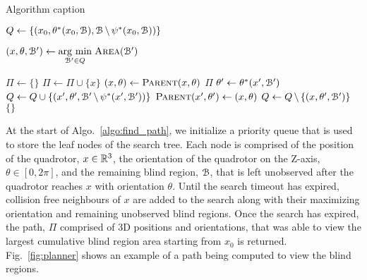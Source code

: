 \begin{algorithm}[h!]
    \caption{Algorithm caption}
    \label{algo:find_path}
    \begin{algorithmic}[1]
        \setcounter{ALC@line}{0}

        \STATE $Q \leftarrow \{(x_0, \theta^*(x_0, {{\mathcal{B}}}),
            {{\mathcal{B}}} \, \backslash \, \psi^*(x_0, {{\mathcal{B}}}))\}$

        \STATE $(x, \theta, {{\mathcal{B'}}}) \leftarrow \underset{{{\mathcal{B'}}} \in Q}{\operatorname{arg}\,\operatorname{min}}\; {\textsc{Area}}({{\mathcal{B'}}})$

                \STATE $\Pi \leftarrow \{\}$
                    \STATE $\Pi \leftarrow \Pi \cup \{x\}$
                    \STATE $(x, \theta) \leftarrow {\textsc{Parent}}(x, \theta)$
                \ENDWHILE
                \RETURN $\Pi$
            \ENDIF
            \STATE $\theta' \leftarrow \theta^*(x', {{\mathcal{B'}}})$
            \STATE $Q \leftarrow Q \cup \{(x', \theta', {{\mathcal{B'}}} \, \backslash \,
                    \psi^*(x', {{\mathcal{B'}}}))\}$
                \STATE ${\textsc{Parent}}(x', \theta') \leftarrow (x, \theta)$
            \ENDFOR
            \STATE $Q \leftarrow Q \, \backslash \, \{(x, \theta', {{\mathcal{B'}}})\}$
        \ENDWHILE
        \RETURN $\{\}$

    \end{algorithmic}
\end{algorithm}

At the start of Algo.~\ref{algo:find_path}, we initialize a priority queue that
is used to store the leaf nodes of the search tree. Each node is comprised of
the position of the quadrotor, $x \in \mathbb{R}^3$, the orientation of the quadrotor
on the Z-axis, $\theta \in [0, 2\pi]$, and the remaining blind region, ${{\mathcal{B}}}$,
that is left unobserved after the quadrotor reaches $x$ with orientation
$\theta$. Until the search timeout has expired, collision free neighbours of
$x$ are added to the search along with their maximizing orientation and
remaining unobserved blind regions.  Once the search has expired, the path,
$\Pi$ comprised of 3D positions and orientations, that was able to view the
largest cumulative blind region area starting from $x_0$ is returned.
Fig.~\ref{fig:planner} shows an example of a path being computed to view the
blind regions.

